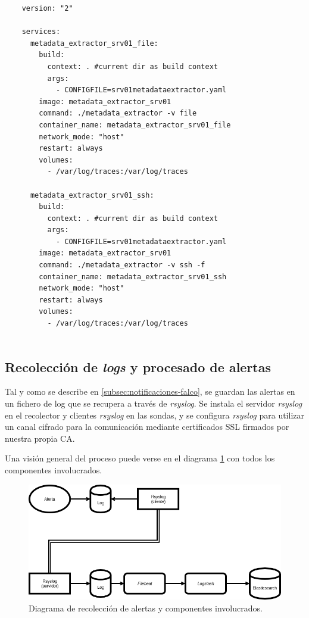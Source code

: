 \begin{verbatim}
    version: "2"
    
    services:
      metadata_extractor_srv01_file:
        build:
          context: . #current dir as build context
          args:
            - CONFIGFILE=srv01metadataextractor.yaml
        image: metadata_extractor_srv01
        command: ./metadata_extractor -v file
        container_name: metadata_extractor_srv01_file
        network_mode: "host"
        restart: always
        volumes:
          - /var/log/traces:/var/log/traces
         
      metadata_extractor_srv01_ssh:
        build:
          context: . #current dir as build context
          args:
            - CONFIGFILE=srv01metadataextractor.yaml
        image: metadata_extractor_srv01
        command: ./metadata_extractor -v ssh -f
        container_name: metadata_extractor_srv01_ssh
        network_mode: "host"
        restart: always
        volumes:
          - /var/log/traces:/var/log/traces
         
\end{verbatim}
\bigskip

\subsection{Recolección de \emph{logs} y procesado de alertas}

Tal y como se describe en \ref{subsec:notificaciones-falco}, se guardan las alertas en un fichero de log que se recupera a través de
\emph{rsyslog}. 
Se instala el servidor \emph{rsyslog} en el recolector y clientes \emph{rsyslog} en las sondas, y se configura \emph{rsyslog}
para utilizar un canal cifrado para la comunicación mediante certificados SSL firmados por nuestra propia CA.

Una visión general del proceso puede verse en el diagrama \ref{fig:alert-log-architecture} con todos los componentes involucrados.

\begin{figure}[htp]
    \centering
    \includegraphics[scale=0.4]{images/AlertasEnvioLog}
    \caption{Diagrama de recolección de alertas y componentes involucrados.}
    \label{fig:alert-log-architecture}
\end{figure}


